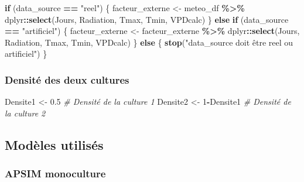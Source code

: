 \documentclass[
]{article}
\newenvironment{Shaded}{\begin{snugshade}}{\end{snugshade}}
\newcommand{\CommentTok}[1]{\textcolor[rgb]{0.56,0.35,0.01}{\textit{#1}}}
\newcommand{\ControlFlowTok}[1]{\textcolor[rgb]{0.13,0.29,0.53}{\textbf{#1}}}
\newcommand{\DecValTok}[1]{\textcolor[rgb]{0.00,0.00,0.81}{#1}}
\newcommand{\FloatTok}[1]{\textcolor[rgb]{0.00,0.00,0.81}{#1}}
\newcommand{\FunctionTok}[1]{\textcolor[rgb]{0.13,0.29,0.53}{\textbf{#1}}}
\newcommand{\NormalTok}[1]{#1}
\newcommand{\OtherTok}[1]{\textcolor[rgb]{0.56,0.35,0.01}{#1}}
\newcommand{\SpecialCharTok}[1]{\textcolor[rgb]{0.81,0.36,0.00}{\textbf{#1}}}
\newcommand{\StringTok}[1]{\textcolor[rgb]{0.31,0.60,0.02}{#1}}
\begin{document}
\begin{Shaded}
\begin{Highlighting}[]
\ControlFlowTok{if}\NormalTok{ (data\_source }\SpecialCharTok{==} \StringTok{"reel"}\NormalTok{) \{}
\NormalTok{  facteur\_externe }\OtherTok{\textless{}{-}}\NormalTok{ meteo\_df }\SpecialCharTok{\%\textgreater{}\%}
\NormalTok{    dplyr}\SpecialCharTok{::}\FunctionTok{select}\NormalTok{(Jours, Radiation, Tmax, Tmin, VPDcalc)}
\NormalTok{\} }\ControlFlowTok{else} \ControlFlowTok{if}\NormalTok{ (data\_source }\SpecialCharTok{==} \StringTok{"artificiel"}\NormalTok{) \{}
\NormalTok{  facteur\_externe }\OtherTok{\textless{}{-}}\NormalTok{ facteur\_externe }\SpecialCharTok{\%\textgreater{}\%}
\NormalTok{    dplyr}\SpecialCharTok{::}\FunctionTok{select}\NormalTok{(Jours, Radiation, Tmax, Tmin, VPDcalc)}
\NormalTok{\} }\ControlFlowTok{else}\NormalTok{ \{}
  \FunctionTok{stop}\NormalTok{(}\StringTok{"data\_source doit être \textquotesingle{}reel\textquotesingle{} ou \textquotesingle{}artificiel\textquotesingle{}"}\NormalTok{)}
\NormalTok{\}}
\end{Highlighting}
\end{Shaded}

\subsubsection{Densité des deux
cultures}\label{densituxe9-des-deux-cultures}

\begin{Shaded}
\begin{Highlighting}[]
\NormalTok{Densite1 }\OtherTok{\textless{}{-}} \FloatTok{0.5} \CommentTok{\# Densité de la culture 1 }
\NormalTok{Densite2 }\OtherTok{\textless{}{-}} \DecValTok{1}\SpecialCharTok{{-}}\NormalTok{Densite1 }\CommentTok{\# Densité de la culture 2 }
\end{Highlighting}
\end{Shaded}

\newpage

\subsection{Modèles utilisés}\label{moduxe8les-utilisuxe9s}

\subsubsection{APSIM monoculture}\label{apsim-monoculture}
\end{document}
